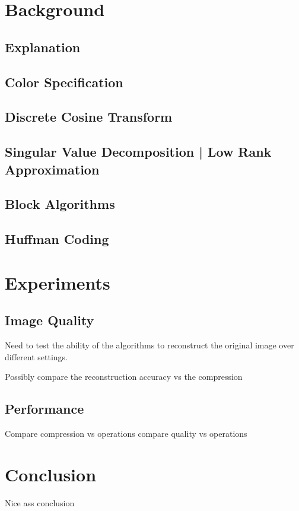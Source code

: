 \documentclass[review,onefignum,onetabnum]{siamart190516}
\begin{document}
\section{Background}
\subsection{Explanation}
\lipsum[12]

\subsection{Color Specification}
\lipsum[13-14]

\subsection{Discrete Cosine Transform}
\lipsum[15-18]

\subsection{Singular Value Decomposition | Low Rank Approximation}
\lipsum[10-20]

\subsection{Block Algorithms}
\lipsum[21-23]

\subsection{Huffman Coding}
\lipsum[24-25]

\section{Experiments}
\subsection{Image Quality}
Need to test the ability of the algorithms to reconstruct the original image 
over different settings.

Possibly compare the reconstruction accuracy vs the compression

\lipsum[26-30]

\subsection{Performance}
Compare compression vs operations
compare quality vs operations

\lipsum[31-32]

\section{Conclusion}
Nice ass conclusion

\lipsum[33-34]



\end{document}
